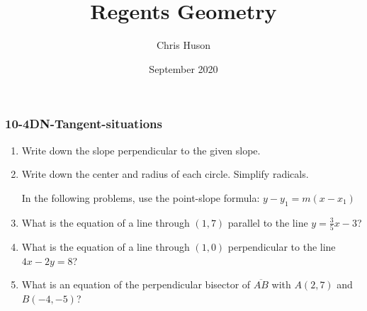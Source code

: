 \documentclass[12pt, twoside]{article}
\title{Regents Geometry}
\author{Chris Huson}
\date{September 2020}
\begin{document}
\subsubsection*{10-4DN-Tangent-situations}
\begin{enumerate}
\item Write down the slope perpendicular to the given slope. \vspace{0.5cm}
  \begin{enumerate}
  \end{enumerate} \vspace{1cm}

\item Write down the center and radius of each circle. Simplify radicals.
  \begin{enumerate}
  \end{enumerate}  \vspace{2cm}

  In the following problems, use the point-slope formula: $y-y_1=m (x-x_1)$
\item What is the equation of a line through $(1,7)$ parallel to the line $y=\frac{3}{5}x-3$?  \vspace{2cm}
\item What is the equation of a line through $(1,0)$ perpendicular to the line $4x-2y=8$?  \vspace{3cm}
  
\item What is an equation of the perpendicular bisector of $\overline{AB}$ with $A(2,7)$ and $B(-4,-5)$? \vspace{2cm}

\newpage


\end{enumerate}
\end{document}
